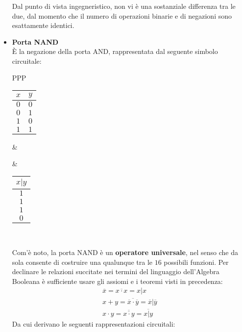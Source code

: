 \documentclass[a4paper]{extarticle}
\begin{document}
\begin{itemize}
    \noindent
    Dal punto di vista ingegneristico, non vi è una sostanziale differenza tra le due, dal momento che il numero di operazioni binarie e di negazioni sono esattamente identici.

    \item \textbf{Porta NAND}\\
    È la negazione della porta AND, rappresentata dal seguente simbolo circuitale:

    \vspace{1em}
    \noindent
    \begin{tabularx}{\textwidth}{PPP}
    {
        \begin{tabular}{c|c}
             \(x\) & \(y\)\\
             \hline
             $0$ & $0$\\
             $0$ & $1$\\
             $1$ & $0$\\
             $1$ & $1$
        \end{tabular}
    }
    &
    {
    }
    &
    {
        \begin{tabular}{c}
             \(x \vert y\)\\
             \hline
             $1$\\
             $1$\\
             $1$\\
             $0$
        \end{tabular}
    }\\
    \end{tabularx}
    \vspace{1em}

    \noindent
    Com'è noto, la porta NAND è un \textbf{operatore universale}, nel senso che da sola consente di costruire una qualunque tra le \(16\) possibili funzioni. Per declinare le relazioni succitate nei termini del linguaggio dell'Algebra Booleana è sufficiente usare gli assiomi e i teoremi visti in precedenza:
    \begin{align*}
        \overline{x} = \overline{x \cdot x} = x | x\\
        x + y = \overline{\overline{x} \cdot \overline{y}} = \overline{x} | \overline{y}\\
        x \cdot y = \overline{\overline{x \cdot y}} = \overline{x | y}
     \end{align*}
     Da cui derivano le seguenti rappresentazioni circuitali:


\end{itemize}
\end{document}
